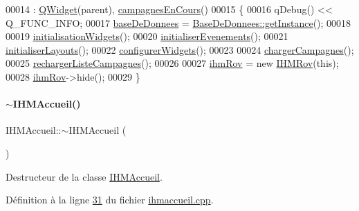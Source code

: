 \begin{DoxyCode}
00014                                       : \hyperlink{class_q_widget}{QWidget}(parent), \hyperlink{class_i_h_m_accueil_ad3827b81480eb201b5927c16a2ad1c46}{campagnesEnCours}()
00015 \{
00016     qDebug() << Q\_FUNC\_INFO;
00017     \hyperlink{class_i_h_m_accueil_ab56d9846c071396a92f88272880e2c1f}{baseDeDonnees} = \hyperlink{class_base_de_donnees_a58beb2f702f75b257e2e55e25d9f979b}{BaseDeDonnees::getInstance}();
00018 
00019     \hyperlink{class_i_h_m_accueil_a1385a94c1a3d75d813429dc9bdc4b050}{initialisationWidgets}();
00020     \hyperlink{class_i_h_m_accueil_a5a571ab8f264c275580501753bb00674}{initialiserEvenements}();
00021     \hyperlink{class_i_h_m_accueil_acaaa5d756165801403ea7d73ae40186b}{initialiserLayouts}();
00022     \hyperlink{class_i_h_m_accueil_a63bc796a325066423ed6146b8bab1437}{configurerWidgets}();
00023 
00024     \hyperlink{class_i_h_m_accueil_a1ed3efefdf929c0d2a6b6d1bb10bbc27}{chargerCampagnes}();
00025     \hyperlink{class_i_h_m_accueil_a44074f2d8d59e0d1b7a3d50c24d2a0df}{rechargerListeCampagnes}();
00026 
00027     \hyperlink{class_i_h_m_accueil_af9f2613056b21bdf82e8f54a26146acc}{ihmRov} = \textcolor{keyword}{new} \hyperlink{class_i_h_m_rov}{IHMRov}(\textcolor{keyword}{this});
00028     \hyperlink{class_i_h_m_accueil_af9f2613056b21bdf82e8f54a26146acc}{ihmRov}->hide();
00029 \}
\end{DoxyCode}
\mbox{\label{class_i_h_m_accueil_a5ea3926747dada8b9677ab9a33c03139}} 
\paragraph{\texorpdfstring{$\sim$\+I\+H\+M\+Accueil()}{~IHMAccueil()}}
{\footnotesize\ttfamily I\+H\+M\+Accueil\+::$\sim$\+I\+H\+M\+Accueil (\begin{DoxyParamCaption}{ }\end{DoxyParamCaption})}



Destructeur de la classe \hyperlink{class_i_h_m_accueil}{I\+H\+M\+Accueil}. 



Définition à la ligne \hyperlink{ihmaccueil_8cpp_source_l00031}{31} du fichier \hyperlink{ihmaccueil_8cpp_source}{ihmaccueil.\+cpp}.



